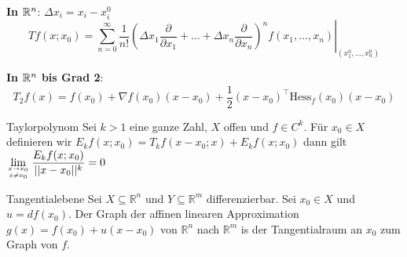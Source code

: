 \textbf{In $\mathbb{R}^n$}: $\Delta x_i = x_i - x_i^0$
\[
	Tf(x;x_0) = \left.\sum_{n=0}^\infty \frac{1}{n!}\left(\Delta x_1 \frac{\partial}{\partial x_1} + ... + \Delta x_n \frac{\partial}{\partial x_n} \right)^n 
		f(x_1, ..., x_n)\right|_{(x_1^0,...,x_n^0)}
\]

\textbf{In $\mathbb{R}^n$ bis Grad 2}:
\[
    T_2f(x) = f(x_0) + \nabla f(x_0)	 (x-x_0) + \frac{1}{2} (x-x_0)^\top \text{Hess}_f(x_0) (x-x_0) 
\]
\begin{Satz}{Taylorpolynom}{}
    Sei $k > 1$ eine ganze Zahl, $X$ offen und $f \in C^k$. Für $x_0 \in X$ definieren wir $E_kf(x;x_0) = T_kf(x - x_0; x) + E_kf(x;x_0)$
    dann gilt $
    \displaystyle\lim_{x \rightarrow x_0 \atop x\neq x_0}\frac{E_kf(x;x_0)}{||x-x_0||^k} =0$ 
\end{Satz}
\begin{Definition}{Tangentialebene}{}
    Sei $X \subseteq \mathbb{R}^n$ und $Y \subseteq \mathbb{R}^m$ differenzierbar. Sei $x_0 \in X$ und $u = df(x_0)$. Der Graph der affinen linearen Approximation
    $g(x) = f(x_0) + u(x - x_0)$ von $\mathbb{R}^n$ nach $\mathbb{R}^m$ is der Tangentialraum an $x_0$ zum Graph von $f$.
\end{Definition}
